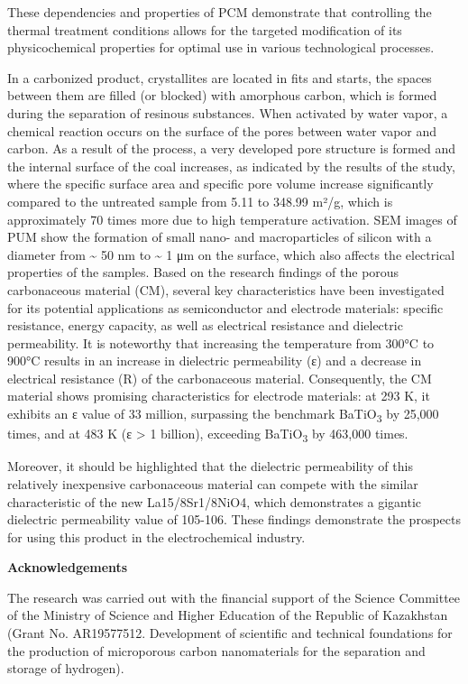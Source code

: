 \begin{multicols}{2}
These dependencies and properties of PCM demonstrate that controlling
the thermal treatment conditions allows for the targeted modification of
its physicochemical properties for optimal use in various technological
processes.

In a carbonized product, crystallites are located in fits and starts,
the spaces between them are filled (or blocked) with amorphous carbon,
which is formed during the separation of resinous substances. When
activated by water vapor, a chemical reaction occurs on the surface of
the pores between water vapor and carbon. As a result of the process, a
very developed pore structure is formed and the internal surface of the
coal increases, as indicated by the results of the study, where the
specific surface area and specific pore volume increase significantly
compared to the untreated sample from 5.11 to 348.99 m²/g, which is
approximately 70 times more due to high temperature activation. SEM
images of PUM show the formation of small nano- and macroparticles of
silicon with a diameter from \textasciitilde{} 50 nm to
\textasciitilde{} 1 μm on the surface, which also affects the electrical
properties of the samples. Based on the research findings of the porous
carbonaceous material (CM), several key characteristics have been
investigated for its potential applications as semiconductor and
electrode materials: specific resistance, energy capacity, as well as
electrical resistance and dielectric permeability. It is noteworthy that
increasing the temperature from 300°C to 900°C results in an increase in
dielectric permeability (ε) and a decrease in electrical resistance (R)
of the carbonaceous material. Consequently, the CM material shows
promising characteristics for electrode materials: at 293 K, it exhibits
an ε value of 33 million, surpassing the benchmark
BaTiO\textsubscript{3} by 25,000 times, and at 483 K (ε \textgreater{} 1
billion), exceeding BaTiO\textsubscript{3} by 463,000 times.

Moreover, it should be highlighted that the dielectric permeability of
this relatively inexpensive carbonaceous material can compete with the
similar characteristic of the new La15/8Sr1/8NiO4, which demonstrates a
gigantic dielectric permeability value of 105-106. These findings
demonstrate the prospects for using this product in the electrochemical
industry.

{\bfseries Acknowledgements}

The research was carried out with the financial support of the Science
Committee of the Ministry of Science and Higher Education of the
Republic of Kazakhstan (Grant No. AR19577512. Development of scientific
and technical foundations for the production of microporous carbon
nanomaterials for the separation and storage of hydrogen).
\end{multicols}

